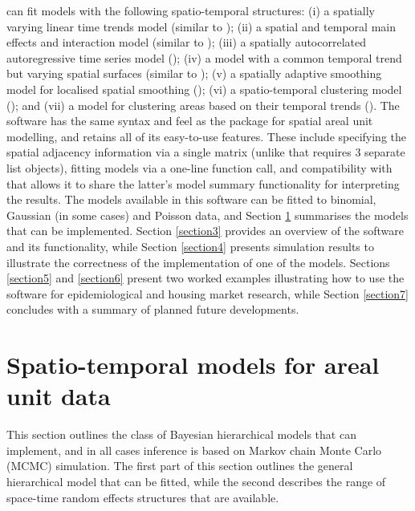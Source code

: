\documentclass[article, nojss]{jss}
\begin{document}
 can fit models with the following spatio-temporal structures: (i) a spatially varying linear time trends model (similar to \citealp{bernardinelli1995}); (ii) a spatial and temporal main effects and interaction model (similar to \citealp{knorrheld2000}); (iii) a spatially autocorrelated autoregressive time series model (\citealp{rushworth2014}); (iv) a model with a common temporal trend but varying spatial surfaces (similar to \citealp{napier2016}); (v) a spatially adaptive smoothing model for localised spatial smoothing (\citealp{rushworth2016}); (vi) a spatio-temporal clustering model (\citealp{lee2016}); and (vii) a model for clustering areas based on their temporal trends (\citealp{napier2018}). The software has the same syntax and feel as the  package  for spatial areal unit modelling, and retains all of its easy-to-use features. These include specifying the spatial adjacency information via a single matrix (unlike  that requires 3 separate list objects), fitting models via a one-line function call, and compatibility with  that allows it to share the latter's model summary functionality for interpreting the results. The models available in this software can be fitted to binomial, Gaussian (in some cases) and Poisson data, and Section \ref{section2} summarises the models that can be implemented. Section \ref{section3} provides an overview of the software and its functionality, while Section \ref{section4} presents simulation results to illustrate the correctness of the  implementation of one of the models. Sections \ref{section5} and \ref{section6} present two worked examples illustrating how to use the software for epidemiological and housing market research, while Section \ref{section7} concludes with a summary of planned future developments.



\section{Spatio-temporal models for areal unit data}\label{section2}
This section outlines the class of Bayesian hierarchical models that  can implement, and in all cases inference is based on Markov chain Monte Carlo (MCMC) simulation. The first part of this section outlines the general hierarchical model that can be fitted, while the second describes the range of space-time random effects structures that are available.
\end{document}
